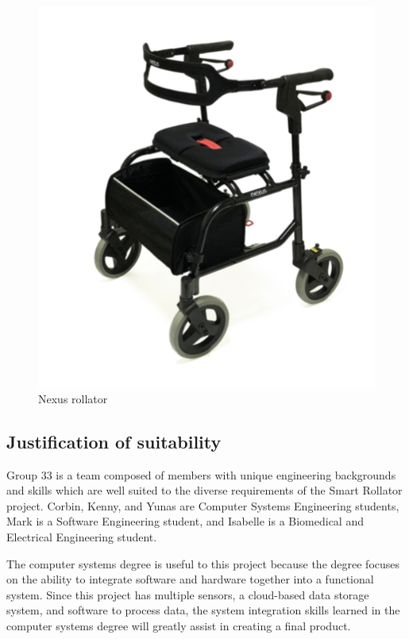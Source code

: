 \documentclass{article}
\begin{document}
\begin{figure}[!h]
    \centering
    \includegraphics[scale=0.5]{nexus_rollator.png}
    \caption{Nexus rollator}
    \label{fig:1}
\end{figure}


\subsection{Justification of suitability}
Group 33 is a team composed of members with unique engineering backgrounds and skills which are well suited to the diverse requirements of the Smart Rollator project. Corbin, Kenny, and Yunas are Computer Systems Engineering students, Mark is a Software Engineering student, and Isabelle is a Biomedical and Electrical Engineering student. 

The computer systems degree is useful to this project because the degree focuses on the ability to integrate software and hardware together into a functional system. Since this project has multiple sensors, a cloud-based data storage system, and software to process data, the system integration skills learned in the computer systems degree will greatly assist in creating a final product. 
\end{document}
